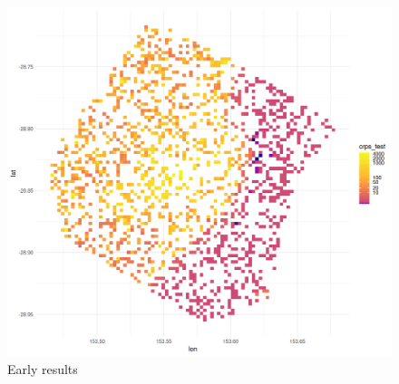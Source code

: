 \documentclass[
  12pt,
  letterpaper,
  DIV=11,
  numbers=noendperiod]{scrartcl}
\begin{document}
\begin{figure}[H]

{\centering \includegraphics{figures/crps_examp.png}

}

\caption{Early results}

\end{figure}%


\renewcommand\refname{Conclusion}
  
\end{document}

